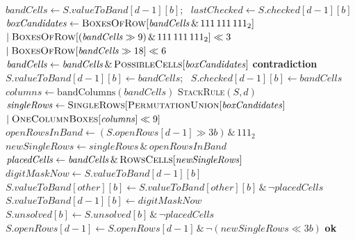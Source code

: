\documentclass[a4paper,USenglish,cleveref,anonymous]{lipics-v2021}
\let\origtextsc\textsc
\renewcommand{\textsc}[1]{\textup{\origtextsc{#1}}}
\begin{document}
\begin{algorithm}[t]
\caption{\textsc{UpdateBand}$_b(S, d)$: band rule, stack rule and row singles for digit $d$ in band $b$}
\label{alg:band}
\begin{algorithmic}[1]
\State $\mathit{bandCells} \gets S.\mathit{valueToBand}[d-1][b]$; \ $\mathit{lastChecked} \gets S.\mathit{checked}[d-1][b]$
\State $\mathit{boxCandidates} \gets \textsc{BoxesOfRow}[\mathit{bandCells} \,\&\, 111\,111\,111_2]$
  \Statex \hspace{\algorithmicindent}\hspace{\algorithmicindent}$\mid \textsc{BoxesOfRow}[(\mathit{bandCells}\gg 9)\,\&\,111\,111\,111_2]\ll 3$
  \Statex \hspace{\algorithmicindent}\hspace{\algorithmicindent}$\mid \textsc{BoxesOfRow}[\mathit{bandCells}\gg 18]\ll 6$ 
\State $\mathit{bandCells} \gets \mathit{bandCells} \,\&\, \textsc{PossibleCells}[\mathit{boxCandidates}]$ 
 \Return \textbf{contradiction} \EndIf
\State $S.\mathit{valueToBand}[d-1][b] \gets \mathit{bandCells}$; \ $S.\mathit{checked}[d-1][b] \gets \mathit{bandCells}$
\State $\mathit{columns} \gets \mathrm{bandColumns}(\mathit{bandCells})$
 \textsc{StackRule}$(S, d)$ \EndIf
\State $\mathit{singleRows} \gets \textsc{SingleRows}[\textsc{PermutationUnion}[\mathit{boxCandidates}]$
  \Statex \hspace{\algorithmicindent}\hspace{\algorithmicindent}$\mid \textsc{OneColumnBoxes}[\mathit{columns}]\ll 9]$
\State $\mathit{openRowsInBand} \gets (S.\mathit{openRows}[d-1] \gg 3b) \,\&\, 111_2$ 
  \Statex \hspace{\algorithmicindent}$\mathit{newSingleRows} \gets \mathit{singleRows} \,\&\, \mathit{openRowsInBand}$
  \State $\mathit{placedCells} \gets \mathit{bandCells} \,\&\, \textsc{RowsCells}[\mathit{newSingleRows}]$ 
  \State $\mathit{digitMaskNow} \gets S.\mathit{valueToBand}[d-1][b]$ 
   $S.\mathit{valueToBand}[\mathit{other}][b] \gets S.\mathit{valueToBand}[\mathit{other}][b] \,\&\, \lnot\mathit{placedCells}$ \EndFor
  \State $S.\mathit{valueToBand}[d-1][b] \gets \mathit{digitMaskNow}$ 
  \State $S.\mathit{unsolved}[b] \gets S.\mathit{unsolved}[b] \,\&\, \lnot\mathit{placedCells}$
  \Statex \hspace{\algorithmicindent}$S.\mathit{openRows}[d-1] \gets S.\mathit{openRows}[d-1] \,\&\, \lnot(\mathit{newSingleRows}\ll 3b)$
\EndIf
\State \Return \textbf{ok}
\end{algorithmic}
\end{algorithm}
\end{document}
